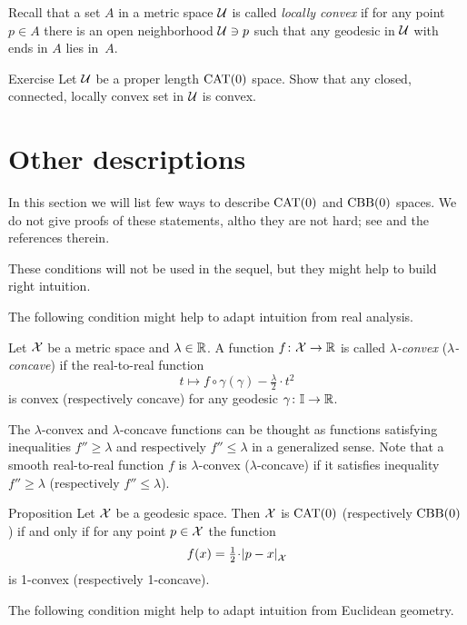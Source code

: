 Recall that a set $A$ in a metric space $\mathcal{U}$ is called \emph{locally convex} if for any point $p\in A$ there is an open neighborhood $\mathcal{U}\ni p$ such that any geodesic in $\mathcal{U}$ with  ends in $A$ lies in~$A$. 

\begin{thm}{Exercise}\label{ex:locally-convex}
Let $\mathcal{U}$ be a proper length $\mathrm{CAT}(0)$ space.
Show that any closed, connected, locally convex set in $\mathcal{U}$ is convex.
\end{thm}



\section{Other descriptions}

In this section we will list few ways to describe $\mathrm{CAT}(0)$ and $\mathrm{CBB}(0)$ spaces.
We do not give proofs of these statements, altho they are not hard;
see \cite{alexander-kapovitch-petrunin-2025} and the references therein.

These conditions will not be used in the sequel, but they might help to build right intuition.  

The following condition might help to adapt intuition from real analysis.

Let $\mathcal{X}$ be a metric space and $\lambda\in\mathbb{R}$.
A function $f\colon\mathcal{X}\to \mathbb{R}$ is called \emph{$\lambda$-convex} (\emph{$\lambda$-concave}) if 
the real-to-real function 
\[t\mapsto f\circ\gamma(\gamma)-\tfrac{\lambda}{2}\cdot t^2\] 
is convex (respectively concave)
for any geodesic $\gamma\colon\mathbb{I}\to \mathbb{R}$.

The $\lambda$-convex  and $\lambda$-concave functions can be thought as functions satisfying inequalities $f''\ge\lambda$ and respectively $f''\le\lambda$ in a generalized sense.
Note that a smooth real-to-real function $f$ is $\lambda$-convex ($\lambda$-concave) if it satisfies inequality $f''\ge\lambda$ (respectively $f''\le\lambda$).

\begin{thm}{Proposition}
Let $\mathcal{X}$ be a geodesic space.
Then $\mathcal{X}$ is $\mathrm{CAT}(0)$ (respectively $\mathrm{CBB}(0)$) if and only if for any point $p\in \mathcal{X}$ the function
\[f(x)=\tfrac12\cdot\dist{p}{x}{\spc{X}}\]
is 1-convex (respectively 1-concave).
\end{thm}

The following condition might help to adapt intuition from Euclidean geometry.

